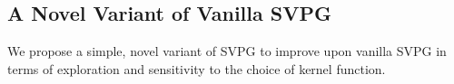 
\subsection*{A Novel Variant of Vanilla SVPG}

We propose a simple, novel variant of SVPG to improve upon vanilla SVPG in terms of exploration and sensitivity to the choice of kernel function. 

